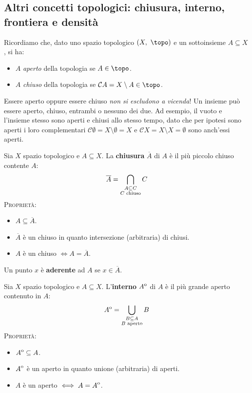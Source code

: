 \subsection{Altri concetti topologici: chiusura, interno, frontiera e densità}
Ricordiamo che, dato uno spazio topologico $\left(X,\ \topo\right)$ e un sottoinsieme $A\subseteq X$, si ha:
\begin{itemize}
\item $A$ \textit{aperto} della topologia se $A\in\topo$.
\item $A$ \textit{chiuso} della topologia se $\mathcal{C}A=X\setminus A\in\topo$.
\end{itemize}
\begin{attention}
Essere aperto oppure essere chiuso \textit{non si escludono a vicenda}! Un insieme può essere aperto, chiuso, entrambi o nessuno dei due. Ad esempio, il vuoto e l'insieme stesso sono aperti e chiusi allo stesso tempo, dato che per ipotesi sono aperti i loro complementari $\mathcal{C}\emptyset = X\setminus \emptyset = X$ e $\mathcal{C}X = X\setminus X = \emptyset$ sono anch'essi aperti.
\end{attention}
\begin{define}
Sia $X$ spazio topologico e $A\subseteq X$. La \textbf{chiusura} $\overline{A}$ di $A$ è il più piccolo chiuso contente $A$:
\begin{equation}
\overline{A}=\mathop{{\bigcap}}\displaylimits_{\substack{A\subseteq C\\ C\text{ chiuso}}}C
\end{equation}
\textsc{Proprietà:}
\begin{itemize}
\item $A\subseteq \overline{A}$.
\item $\overline{A}$ è un chiuso in quanto intersezione (arbitraria) di chiusi.
\item $A$ è un chiuso $\iff A=\overline{A}$.
\end{itemize}
\end{define}
\begin{define}
Un punto $x$ è \textbf{aderente} ad $A$ se $x\in\overline{A}$.
\end{define}
\begin{define}
Sia $X$ spazio topologico e $A\subseteq X$. L'\textbf{interno} ${\kern0ptA}^{\mathrm{o}}$ di $A$ è il più grande aperto contenuto in $A$:
\begin{equation}
	{\kern0ptA}^{\mathrm{o}}=\mathop{{\bigcup}}\displaylimits_{\substack{B\subseteq A\\ B\text{ aperto}}}B
\end{equation}
\textsc{Proprietà:}
\begin{itemize}
	\item ${\kern0ptA}^{\mathrm{o}}\subseteq A$.
	\item ${\kern0ptA}^{\mathrm{o}}$ è un aperto in quanto unione (arbitraria) di aperti.
	\item $A$ è un aperto $\iff A={\kern0ptA}^{\mathrm{o}}$.
\end{itemize}
\end{define}
